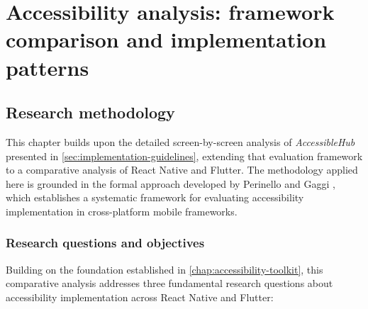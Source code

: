 \chapter{Accessibility analysis: framework comparison and implementation patterns} 
\label{chap:implementation}

\section{Research methodology}
This chapter builds upon the detailed screen-by-screen analysis of \textit{AccessibleHub} presented in \ref{sec:implementation-guidelines}, extending that evaluation framework to a comparative analysis of React Native and Flutter. The methodology applied here is grounded in the formal approach developed by Perinello and Gaggi \cite{perinello2024accessibility}, which establishes a systematic framework for evaluating accessibility implementation in cross-platform mobile frameworks.

\subsection{Research questions and objectives}

Building on the foundation established in \ref{chap:accessibility-toolkit}, this comparative analysis addresses three fundamental research questions about accessibility implementation across React Native and Flutter:

